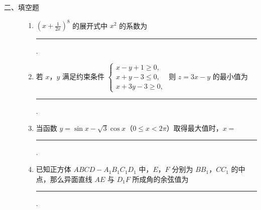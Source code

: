 \begin{description}

    \item[二、填空题]

    \begin{enumerate}[leftmargin=5pt]

      \addtocounter{enumi}{+12}

        \item \(\left(x + \frac{1}{2x}\right)^8\) 的展开式中 \(x^2\) 的系数为\rule[-0.3ex]{3em}{0.4pt}.

        \item 若 \(x\)，\(y\) 满足约束条件 \(\begin{cases}
x - y + 1 \geqslant 0,\\
x + y - 3 \leqslant 0,\\
x + 3y - 3 \geqslant 0,
\end{cases}\) 则 \(z = 3x - y\) 的最小值为\rule[-0.3ex]{3em}{0.4pt}.

        \item 当函数 \( y = \sin x - \sqrt{3}\cos x \)（\(0 \leqslant x < 2\pi\)）取得最大值时，\( x = \)\rule[-0.3ex]{3em}{0.4pt}.

        \item 已知正方体 \(ABCD - A_{1}B_{1}C_{1}D_{1}\) 中，\(E\)，\(F\) 分别为 \(BB_{1}\)，\(CC_{1}\) 的中点，那么异面直线 \(AE\) 与 \(D_{1}F\) 所成角的余弦值为\rule[-0.3ex]{3em}{0.4pt}.

    \end{enumerate}

\end{description}

